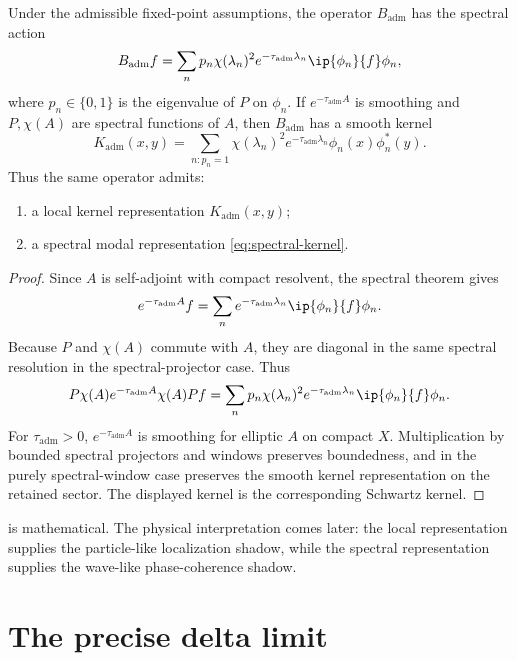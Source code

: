 \documentclass[11pt]{article}
\newcommand{\Kadm}{K_{\mathrm{adm}}}
\newcommand{\Badm}{B_{\mathrm{adm}}}
\newcommand{\ta}{\tau_{\mathrm{adm}}}
\begin{document}
\begin{theorem}
\label{thm:dual-representation}
Under the admissible fixed-point assumptions, the operator \(\Badm\) has the spectral action
\[
  \Badm f
  =
  \sum_n p_n\chi(\lambda_n)^2e^{-\ta\lambda_n}
  \ip{\phi_n}{f}\phi_n,
\]
where \(p_n\in\{0,1\}\) is the eigenvalue of \(P\) on \(\phi_n\). If \(e^{-\ta A}\) is smoothing
and \(P,\chi(A)\) are spectral functions of \(A\), then \(\Badm\) has a smooth kernel
\[
  \Kadm(x,y)
  =
  \sum_{n:p_n=1}
  \chi(\lambda_n)^2e^{-\ta\lambda_n}
  \phi_n(x)\phi_n^\ast(y).
  \label{eq:spectral-kernel}
\]
Thus the same operator admits:
\begin{enumerate}[label=(\roman*)]
  \item a local kernel representation \(\Kadm(x,y)\);
  \item a spectral modal representation \cref{eq:spectral-kernel}.
\end{enumerate}
\end{theorem}

\begin{proof}
Since \(A\) is self-adjoint with compact resolvent, the spectral theorem gives
\[
  e^{-\ta A}f=\sum_n e^{-\ta\lambda_n}\ip{\phi_n}{f}\phi_n.
\]
Because \(P\) and \(\chi(A)\) commute with \(A\), they are diagonal in the same spectral
resolution in the spectral-projector case. Thus
\[
  P\chi(A)e^{-\ta A}\chi(A)P f
  =
  \sum_n p_n\chi(\lambda_n)^2e^{-\ta\lambda_n}
  \ip{\phi_n}{f}\phi_n.
\]
For \(\ta>0\), \(e^{-\ta A}\) is smoothing for elliptic \(A\) on compact \(X\). Multiplication
by bounded spectral projectors and windows preserves boundedness, and in the purely
spectral-window case preserves the smooth kernel representation on the retained sector.
The displayed kernel is the corresponding Schwartz kernel.
\end{proof}

\begin{remark}
 is mathematical. The physical interpretation comes later:
the local representation supplies the particle-like localization shadow, while the spectral
representation supplies the wave-like phase-coherence shadow.
\end{remark}

\section{The precise delta limit}
\end{document}
